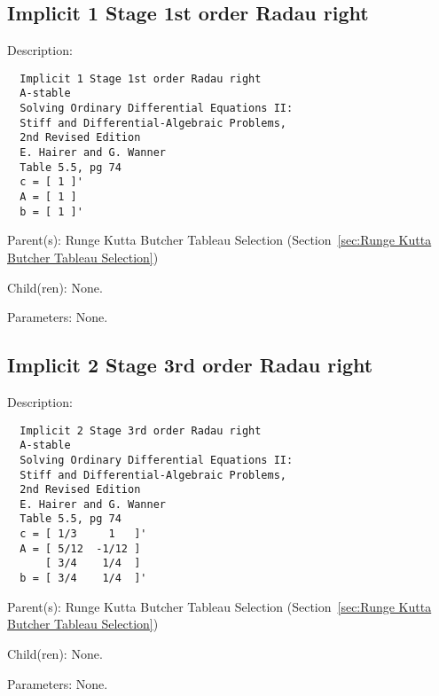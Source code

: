 \subsection{Implicit 1 Stage 1st order Radau right}
\label{sec:Implicit 1 Stage 1st order Radau right}

\begin{list}{}
  {\setlength{\leftmargin}{1.0in}
   \setlength{\labelwidth}{0.75in}
   \setlength{\labelsep}{0.125in}}
  \item[Description:]
\begin{verbatim}
  Implicit 1 Stage 1st order Radau right
  A-stable
  Solving Ordinary Differential Equations II:
  Stiff and Differential-Algebraic Problems,
  2nd Revised Edition
  E. Hairer and G. Wanner
  Table 5.5, pg 74
  c = [ 1 ]'
  A = [ 1 ]
  b = [ 1 ]'
\end{verbatim}
  \item[Parent(s):]
    Runge Kutta Butcher Tableau Selection (Section~\ref{sec:Runge Kutta Butcher Tableau Selection})
  \item[Child(ren):]
    None. 
  \item[Parameters:]
    None. 
\end{list}

\subsection{Implicit 2 Stage 3rd order Radau right}
\label{sec:Implicit 2 Stage 3rd order Radau right}

\begin{list}{}
  {\setlength{\leftmargin}{1.0in}
   \setlength{\labelwidth}{0.75in}
   \setlength{\labelsep}{0.125in}}
  \item[Description:]
\begin{verbatim}
  Implicit 2 Stage 3rd order Radau right
  A-stable
  Solving Ordinary Differential Equations II:
  Stiff and Differential-Algebraic Problems,
  2nd Revised Edition
  E. Hairer and G. Wanner
  Table 5.5, pg 74
  c = [ 1/3     1   ]'
  A = [ 5/12  -1/12 ]
      [ 3/4    1/4  ]
  b = [ 3/4    1/4  ]'
\end{verbatim}
  \item[Parent(s):]
    Runge Kutta Butcher Tableau Selection (Section~\ref{sec:Runge Kutta Butcher Tableau Selection})
  \item[Child(ren):]
    None. 
  \item[Parameters:]
    None. 
\end{list}

